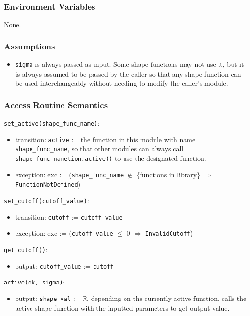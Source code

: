 \documentclass[12pt, titlepage]{article}
\begin{document}
\subsubsection{Environment Variables}
None.

\subsubsection{Assumptions}
\begin{itemize}
  \item \texttt{sigma} is always passed as input. Some shape functions may not use it, but it is always assumed to be passed by the caller so that any shape function can be used interchangeably without needing to modify the caller's module.
\end{itemize}

\subsubsection{Access Routine Semantics}

\noindent \texttt{set\_active(shape\_func\_name)}:
\begin{itemize}
\item transition: \texttt{active} := the function in this module with name \texttt{shape\_func\_name},
\newline so that other modules can always call \texttt{shape\_func\_nametion.active()} to use the designated function.
\item exception: exc := (\texttt{shape\_func\_name} $\notin$ \{functions in library\} $\Rightarrow$ \texttt{FunctionNotDefined})
\end{itemize}

\noindent \texttt{set\_cutoff(cutoff\_value)}:
\begin{itemize}
\item transition: \texttt{cutoff} := \texttt{cutoff\_value}
\item exception: exc := (\texttt{cutoff\_value} $\le$ 0 $\Rightarrow$ \texttt{InvalidCutoff})
\end{itemize}

\noindent \texttt{get\_cutoff()}:
\begin{itemize}
\item output: \texttt{cutoff\_value} := \texttt{cutoff}
\end{itemize}

\noindent \texttt{active(dk, sigma)}:
\begin{itemize}
  \item output: \texttt{shape\_val} := $\mathbb{R}$, depending on the currently active function, 
  \newline calls the active shape function with the inputted parameters to get output value.
\end{itemize}
\end{document}
